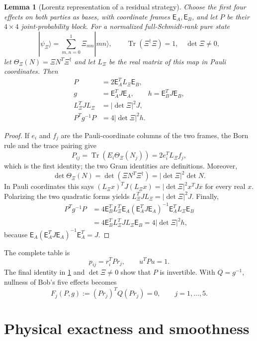 \documentclass[11pt]{article}
\newtheorem{lemma}[theorem]{Lemma}
\theoremstyle{definition}
\newcommand{\Tr}{\operatorname{Tr}}
\begin{document}
\begin{lemma}[Lorentz representation of a residual strategy]
\label{lem:lorentz-representation}
Choose the first four effects on both parties as bases, with coordinate
frames \(\mathsf E_A,\mathsf E_B\), and let \(P\) be their \(4\times4\)
joint-probability block. For a normalized full-Schmidt-rank pure state
\[
|\psi_\Xi\rangle=\sum_{m,n=0}^1\Xi_{mn}|mn\rangle,
\qquad \Tr(\Xi^\dagger\Xi)=1,\quad\det\Xi\ne0,
\]
let \(\Theta_\Xi(N)=\Xi N^T\Xi^\dagger\) and let \(L_\Xi\) be the real matrix
of this map in Pauli coordinates. Then
\[
\begin{aligned}
P&=2\mathsf E_A^TL_\Xi\mathsf E_B,\\
g&=\mathsf E_A^TJ\mathsf E_A,\qquad
h=\mathsf E_B^TJ\mathsf E_B,\\
L_\Xi^TJL_\Xi&=|\det\Xi|^2J,\\
P^Tg^{-1}P&=4|\det\Xi|^2h.
\end{aligned}
\]
\end{lemma}

\begin{proof}
If \(e_i\) and \(f_j\) are the Pauli-coordinate columns of the two frames,
the Born rule and the trace pairing give
\[
P_{ij}=\Tr\!\left(E_i\Theta_\Xi(N_j)\right)
=2e_i^TL_\Xi f_j,
\]
which is the first identity; the two Gram identities are definitions.
Moreover,
\[
\det\Theta_\Xi(N)
=\det(\Xi N^T\Xi^\dagger)
=|\det\Xi|^2\det N.
\]
In Pauli coordinates this says
\((L_\Xi x)^TJ(L_\Xi x)=|\det\Xi|^2x^TJx\) for every real \(x\).
Polarizing the two quadratic forms yields
\(L_\Xi^TJL_\Xi=|\det\Xi|^2J\). Finally,
\[
\begin{aligned}
P^Tg^{-1}P
&=4\mathsf E_B^TL_\Xi^T
\mathsf E_A(\mathsf E_A^TJ\mathsf E_A)^{-1}
\mathsf E_A^TL_\Xi\mathsf E_B\\
&=4\mathsf E_B^TL_\Xi^TJL_\Xi\mathsf E_B
=4|\det\Xi|^2h,
\end{aligned}
\]
because
\(\mathsf E_A(\mathsf E_A^TJ\mathsf E_A)^{-1}\mathsf E_A^T=J\).
\end{proof}

The complete table is
\[
p_{ij}=r_i^TPr_j,\qquad u^TPu=1.
\]
The final identity in \cref{lem:lorentz-representation} and
\(\det\Xi\ne0\) show that \(P\) is invertible. With \(Q=g^{-1}\), nullness
of Bob's five effects becomes
\begin{equation}
\label{eq:incidence}
F_j(P,g):=(Pr_j)^TQ(Pr_j)=0,\qquad j=1,\ldots,5.
\end{equation}

\section{Physical exactness and smoothness}
\label{sec:physical}
\end{document}
